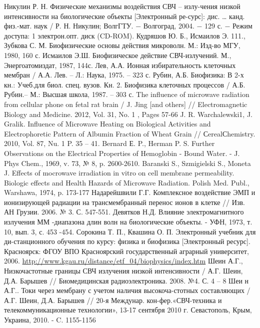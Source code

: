 \def\bibname{СПИСОК ИСПОЛЬЗОВАННЫХ ИСТОЧНИКОВ}
\begin{thebibliography}{99}
 Никулин Р. Н. Физические механизмы воздействия СВЧ – излу-чения низкой интенсивности на биологические объекты [Электронный ре-сурс]: дис. … канд. физ.-мат. наук / Р. Н. Никулин; ВолгГТУ. − Волгоград, 2004. − 129 с. − Режим доступа: 1 электрон.опт. диск (CD-ROM).
 Кудряшов Ю. Б., Исмаилов Э. 111., Зубкова С. М. Биофизические основы действия микроволн. М.: Изд-во МГУ, 1980, 160 с.
 Исмаилов Э.Ш. Биофизическое действие СВЧ-излучений. М., Энергоатомиздат, 1987, 144с.
 Лев, А.А. Ионная избирательность клеточных мембран / А.А. Лев. – Л.: Наука, 1975. – 323 с.
 Рубин, А.Б. Биофизика: В 2-х кн.: Учеб.для биол. спец. вузов. Кн. 2. Биофизика клеточных процессов / А.Б. Рубин.– М.: Высшая школа, 1987. – 303 с.
 The influence of microwave radiation from cellular phone on fetal rat brain / J. Jing [and others] // Electromagnetic Biology and Medicine. 2012, Vol. 31, No. 1 , Pages 57-66
 J. R. Warchalewski1, J. Gralik. Influence of Microwave Heating on Biological Activities and Electrophoretic Pattern of Albumin Fraction of Wheat Grain // СerealСhemistry. 2010, Vol. 87, Nu. 1 P. 35 – 41.
 Bernard Е. P., Herman P. S. Further Observations on the Electrical Properties of Hemoglobin - Bound Water. - J. Phys Chem., 1969, v. 73, № 8, p. 2600-2610.
 Baranski S., Szmigielski S., Moneta J. Effects of mocrowave irradiation in vitro on cell membrane permeability. Biologic effects and Health Hazards of Microwave Radiation. Polish Med. Publ., Warshawa, 1974, p. 173-177
 Надарейшвили Г.Г. Комплексное воздействие ЭМП и ионизирующей радиации на трансмембранный перенос ионов в клетке // Изв. АН Грузии. 2006. № 3. С. 547-551.
 Девятков Н.Д. Влияние электромагнитного излучения ММ -диапазона длин волн на биологические объекты. - УФН, 1973, т. 10, вып. 3, с. 453 -454.
 Сорокина Т. П., Квашина О. П. Электронный учебник для
    ди-станционного обучения по курсу: физика и биофизика [Электронный
    ресурс]. Красноярск: ФГОУ ВПО Красноярский государственный аграрный
    университет, 2006.
    \url{http://www.kgau.ru/distance/etf_04/biophysics/index.htm}
 Шеин А.Г., Низкочастотные границы СВЧ излучения низкой интенсивности  / А.Г. Шеин, Д.А. Барышев // Биомедицинская радиоэлектроника. 2008. №4. С. 4 – 8
 Шеи н А.Г..  Токи через мембрану с учетом наличия высокоча-стотных составляющих  / А.Г. Шеин, Д.А. Барышев // 20-я Междунар. кон-фер.«СВЧ-техника и телекоммуникационные технологии», 13-17 сентября 2010 г. Севастополь, Крым, Украина, 2010. - C. 1155-1156

\end{thebibliography}
